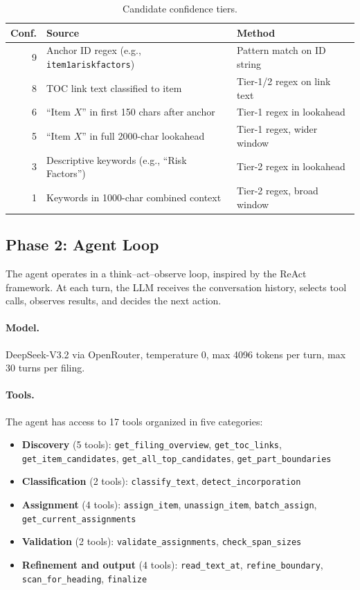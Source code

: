 \documentclass[11pt,a4paper]{article}
\begin{document}
\begin{table}[H]
\centering
\caption{Candidate confidence tiers.}
\label{tab:tiers}
\begin{tabular}{rll}
\toprule
\textbf{Conf.} & \textbf{Source} & \textbf{Method}\\
\midrule
9 & Anchor ID regex (e.g., \texttt{item1ariskfactors}) & Pattern match on ID string\\
8 & TOC link text classified to item & Tier-1/2 regex on link text\\
6 & ``Item $X$'' in first 150 chars after anchor & Tier-1 regex in lookahead\\
5 & ``Item $X$'' in full 2000-char lookahead & Tier-1 regex, wider window\\
3 & Descriptive keywords (e.g., ``Risk Factors'') & Tier-2 regex in lookahead\\
1 & Keywords in 1000-char combined context & Tier-2 regex, broad window\\
\bottomrule
\end{tabular}
\end{table}

\subsection{Phase 2: Agent Loop}

The agent operates in a think--act--observe loop, inspired by the ReAct framework. At each turn, the LLM receives the conversation history, selects tool calls, observes results, and decides the next action.

\paragraph{Model.} DeepSeek-V3.2 via OpenRouter, temperature 0, max 4096 tokens per turn, max 30 turns per filing.

\paragraph{Tools.} The agent has access to 17 tools organized in five categories:

\begin{itemize}[nosep]
    \item \textbf{Discovery} (5 tools): \texttt{get\_filing\_overview}, \texttt{get\_toc\_links}, \texttt{get\_item\_candidates}, \texttt{get\_all\_top\_candidates}, \texttt{get\_part\_boundaries}
    \item \textbf{Classification} (2 tools): \texttt{classify\_text}, \texttt{detect\_incorporation}
    \item \textbf{Assignment} (4 tools): \texttt{assign\_item}, \texttt{unassign\_item}, \texttt{batch\_assign}, \texttt{get\_current\_assignments}
    \item \textbf{Validation} (2 tools): \texttt{validate\_assignments}, \texttt{check\_span\_sizes}
    \item \textbf{Refinement and output} (4 tools): \texttt{read\_text\_at}, \texttt{refine\_boundary}, \texttt{scan\_for\_heading}, \texttt{finalize}
\end{itemize}
\end{document}
